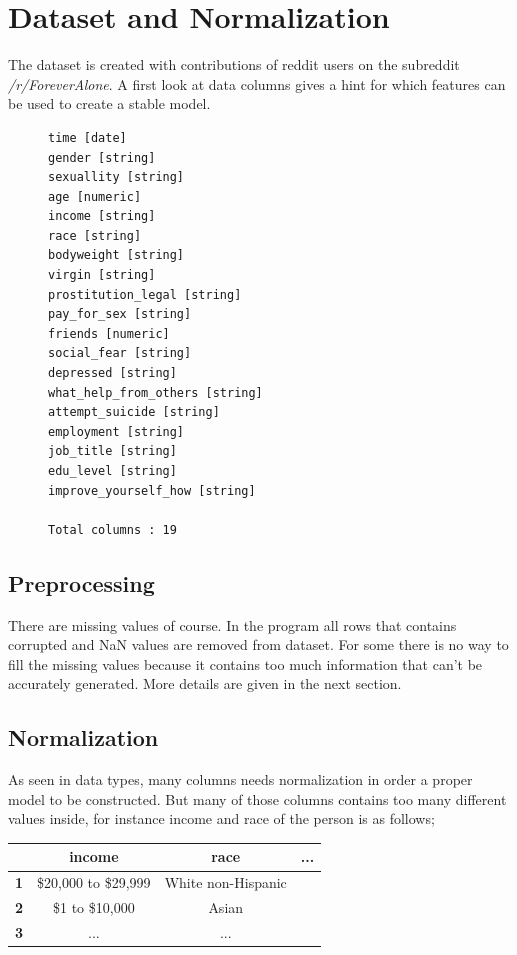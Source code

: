 \documentclass{article}
\begin{document}
\section{Dataset and Normalization} %

The dataset is created with contributions of reddit users on the subreddit \textit{ /r/ForeverAlone}. A first look at data columns gives a hint for which features can be used to create a stable model.

\begin{figure}[H]
\centering
\begin{BVerbatim}
time [date]
gender [string]
sexuallity [string]
age [numeric]
income [string]
race [string]
bodyweight [string]
virgin [string]
prostitution_legal [string]
pay_for_sex [string]
friends [numeric]
social_fear [string]
depressed [string]
what_help_from_others [string]
attempt_suicide [string]
employment [string]
job_title [string]
edu_level [string]
improve_yourself_how [string]

Total columns : 19
\end{BVerbatim}

\end{figure}

\subsection{Preprocessing }
There are missing values of course. In the program all rows that contains corrupted and NaN values are removed from dataset. For some there is no way to fill the missing values because it contains too much information that can't be accurately generated. More details are given in the next section.

\subsection{Normalization }

As seen in data types, many columns needs normalization in order a proper model to be constructed. But many of those columns contains too many different values inside, for instance income and race of the person is as follows;

\begin{table}[H]
\begin{center}
\begin{tabular}{|c|c|c|c|}
\hline
\textbf{}  & \textbf{income}    & \textbf{race}      & \textbf{...} \\ \hline
\textbf{1} & \$20,000 to \$29,999 & White non-Hispanic &              \\ \hline
\textbf{2} & \$1 to \$10,000      & Asian              &              \\ \hline
\textbf{3} & ...                & ...                &              \\ \hline
\end{tabular}
\end{center}
\end{table}
\end{document}

